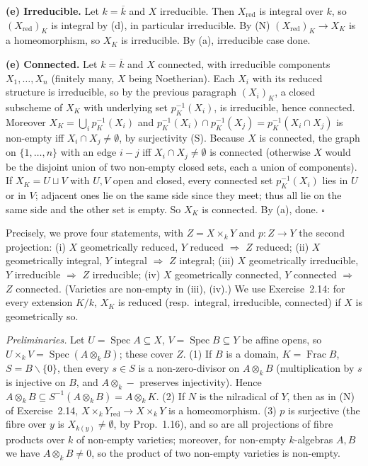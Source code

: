 \documentclass[11pt]{article}
\begin{document}
\textbf{(e) Irreducible.} Let $k=\overline k$ and $X$ irreducible. Then $X_{\operatorname{red}}$ is integral over $k$, so $(X_{\operatorname{red}})_K$ is integral by (d), in particular irreducible. By (N) $(X_{\operatorname{red}})_K\to X_K$ is a homeomorphism, so $X_K$ is irreducible. By (a), irreducible case done.

\textbf{(e) Connected.} Let $k=\overline k$ and $X$ connected, with irreducible components $X_1,\dots,X_n$ (finitely many, $X$ being Noetherian). Each $X_i$ with its reduced structure is irreducible, so by the previous paragraph $(X_i)_K$, a closed subscheme of $X_K$ with underlying set $p_K^{-1}(X_i)$, is irreducible, hence connected. Moreover $X_K=\bigcup_ip_K^{-1}(X_i)$ and $p_K^{-1}(X_i)\cap p_K^{-1}(X_j)=p_K^{-1}(X_i\cap X_j)$ is non-empty iff $X_i\cap X_j\neq\emptyset$, by surjectivity (S). Because $X$ is connected, the graph on $\{1,\dots,n\}$ with an edge $i\!-\!j$ iff $X_i\cap X_j\neq\emptyset$ is connected (otherwise $X$ would be the disjoint union of two non-empty closed sets, each a union of components). If $X_K=U\sqcup V$ with $U,V$ open and closed, every connected set $p_K^{-1}(X_i)$ lies in $U$ or in $V$; adjacent ones lie on the same side since they meet; thus all lie on the same side and the other set is empty. So $X_K$ is connected. By (a), done. \hfill$\square$

\pf
Precisely, we prove four statements, with $Z=X\times_kY$ and $p:Z\to Y$ the second projection:
(i) $X$ geometrically reduced, $Y$ reduced $\Rightarrow$ $Z$ reduced; (ii) $X$ geometrically integral, $Y$ integral $\Rightarrow$ $Z$ integral; (iii) $X$ geometrically irreducible, $Y$ irreducible $\Rightarrow$ $Z$ irreducible; (iv) $X$ geometrically connected, $Y$ connected $\Rightarrow$ $Z$ connected. (Varieties are non-empty in (iii), (iv).) We use Exercise~2.14: for every extension $K/k$, $X_K$ is reduced (resp.\ integral, irreducible, connected) if $X$ is geometrically so.

\emph{Preliminaries.} Let $U=\operatorname{Spec}A\subseteq X$, $V=\operatorname{Spec}B\subseteq Y$ be affine opens, so $U\times_kV=\operatorname{Spec}(A\otimes_kB)$; these cover $Z$. (1) If $B$ is a domain, $K=\operatorname{Frac}B$, $S=B\smallsetminus\{0\}$, then every $s\in S$ is a non-zero-divisor on $A\otimes_kB$ (multiplication by $s$ is injective on $B$, and $A\otimes_k-$ preserves injectivity). Hence $A\otimes_kB\subseteq S^{-1}(A\otimes_kB)=A\otimes_kK$. (2) If $N$ is the nilradical of $Y$, then as in (N) of Exercise~2.14, $X\times_kY_{\operatorname{red}}\to X\times_kY$ is a homeomorphism. (3) $p$ is surjective (the fibre over $y$ is $X_{k(y)}\neq\emptyset$, by Prop.~1.16), and so are all projections of fibre products over $k$ of non-empty varieties; moreover, for non-empty $k$-algebras $A,B$ we have $A\otimes_kB\neq0$, so the product of two non-empty varieties is non-empty.
\end{document}
